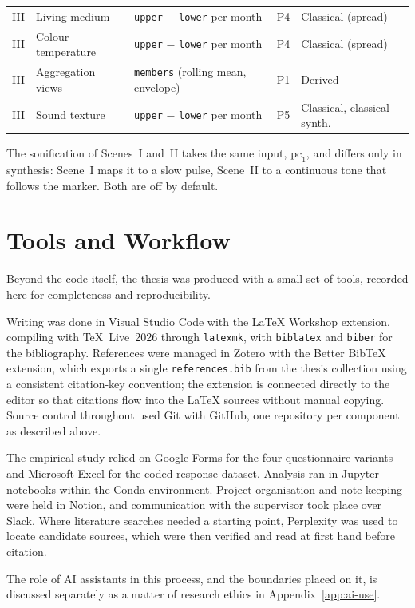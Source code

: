 \begin{table}[tbp]
\begin{tabularx}{\textwidth}{@{}p{1.2cm} X p{3.4cm} p{1.1cm} X@{}}
III & Living medium & \texttt{upper} $-$ \texttt{lower} per month & P4 & Classical (spread) \\
III & Colour temperature & \texttt{upper} $-$ \texttt{lower} per month & P4 & Classical (spread) \\
III & Aggregation views & \texttt{members} (rolling mean, envelope) & P1 & Derived \\
III & Sound texture & \texttt{upper} $-$ \texttt{lower} per month & P5 & Classical, classical synth. \\
\bottomrule
\end{tabularx}
\end{table}

\noindent The sonification of Scenes~I and~II takes the same input, $\mathrm{pc}_1$, and
differs only in synthesis: Scene~I maps it to a slow pulse, Scene~II to a continuous tone that
follows the marker. Both are off by default.

\section{Tools and Workflow}
\label{app:c-tools}

Beyond the code itself, the thesis was produced with a small set of tools, recorded here for
completeness and reproducibility.

Writing was done in Visual Studio Code with the LaTeX Workshop extension, compiling with
\TeX{}~Live~2026 through \texttt{latexmk}, with \texttt{biblatex} and \texttt{biber} for the
bibliography. References were managed in Zotero with the Better BibTeX extension, which
exports a single \texttt{references.bib} from the thesis collection using a consistent
citation-key convention; the extension is connected directly to the editor so that citations
flow into the \LaTeX{} sources without manual copying. Source control throughout used Git with
GitHub, one repository per component as described above.

The empirical study relied on Google Forms for the four questionnaire variants and Microsoft
Excel for the coded response dataset. Analysis ran in Jupyter notebooks within the Conda
environment. Project organisation and note-keeping were held in Notion, and communication with
the supervisor took place over Slack. Where literature searches needed a starting point,
Perplexity was used to locate candidate sources, which were then verified and read at first
hand before citation.

The role of AI assistants in this process, and the boundaries placed on it, is discussed
separately as a matter of research ethics in Appendix~\ref{app:ai-use}.

